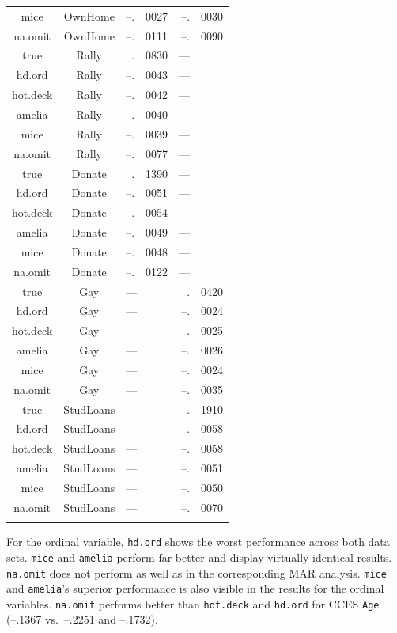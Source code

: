 \documentclass[12pt,econ]{sources/authesis}
\begin{document}
\begin{longtable}{ccr@{}lr@{}l}
 mice & OwnHome & --.&0027 & --.&0030 \\ 
 na.omit & OwnHome & --.&0111 & --.&0090 \\
 true & Rally & .&0830 & --- \\ 
 hd.ord & Rally & --.&0043 & --- \\ 
 hot.deck & Rally & --.&0042 & --- \\ 
 amelia & Rally & --.&0040 & --- \\ 
 mice & Rally & --.&0039 & --- \\ 
 na.omit & Rally & --.&0077 & --- \\  
 true & Donate & .&1390 & --- \\ 
 hd.ord & Donate & --.&0051 & --- \\ 
 hot.deck & Donate & --.&0054 & --- \\ 
 amelia & Donate & --.&0049 & --- \\ 
 mice & Donate & --.&0048 & --- \\ 
 na.omit & Donate & --.&0122 & --- \\ 
 true & Gay & \multicolumn{2}{l}{---} & .&0420 \\ 
 hd.ord & Gay & \multicolumn{2}{l}{---} & --.&0024 \\ 
 hot.deck & Gay & \multicolumn{2}{l}{---} & --.&0025 \\ 
 amelia & Gay & \multicolumn{2}{l}{---} & --.&0026 \\
 mice & Gay & \multicolumn{2}{l}{---} & --.&0024 \\ 
 na.omit & Gay & \multicolumn{2}{l}{---} & --.&0035 \\ 
 true & StudLoans & \multicolumn{2}{l}{---} & .&1910 \\
 hd.ord & StudLoans & \multicolumn{2}{l}{---} & --.&0058 \\
 hot.deck & StudLoans & \multicolumn{2}{l}{---} & --.&0058 \\ 
 amelia & StudLoans & \multicolumn{2}{l}{---} & --.&0051 \\ 
 mice & StudLoans & \multicolumn{2}{l}{---} & --.&0050 \\ 
 na.omit & StudLoans & \multicolumn{2}{l}{---} & --.&0070 \\ 
 \hline \\[-1.8ex]
 \end{longtable}
\dsp

\normalsize

For the ordinal variable, \texttt{hd.ord} shows the worst performance across both data sets. \texttt{mice} and \texttt{amelia} perform far better and display virtually identical results. \texttt{na.omit} does not perform as well as in the corresponding MAR analysis. \texttt{mice} and \texttt{amelia}'s superior performance is also visible in the results for the ordinal variables. \texttt{na.omit} performs better than \texttt{hot.deck} and \texttt{hd.ord} for CCES \texttt{Age} (--.1367 vs.~--.2251 and --.1732).
\end{document}

